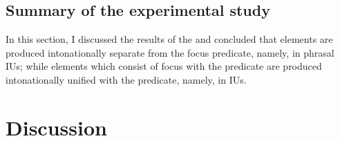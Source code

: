 
\subsection{Summary of the experimental study}

In this section,
I discussed the results of the 
and concluded that
 elements are produced intonationally separate from the focus predicate,
namely, in phrasal IUs;
while elements which consist of focus with the predicate are produced intonationally unified with the predicate,
namely, in  IUs.


\section{Discussion}\label{Int:Disc}


